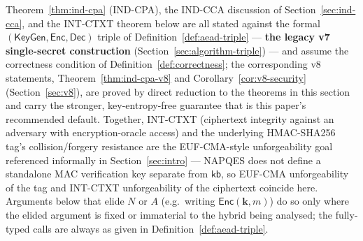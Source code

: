 \documentclass[11pt,a4paper]{article}
\begin{document}
Theorem~\ref{thm:ind-cpa} (IND-CPA), the IND-CCA discussion of
Section~\ref{sec:ind-cca}, and the INT-CTXT theorem below are all stated
against the formal $(\mathsf{KeyGen}, \mathsf{Enc}, \mathsf{Dec})$ triple of
Definition~\ref{def:aead-triple} --- \textbf{the legacy v7 single-secret
construction} (Section~\ref{sec:algorithm-triple}) --- and assume the
correctness condition of Definition~\ref{def:correctness}; the
corresponding v8 statements, Theorem~\ref{thm:ind-cpa-v8} and
Corollary~\ref{cor:v8-security} (Section~\ref{sec:v8}), are proved by
direct reduction to the theorems in this section and carry the stronger,
key-entropy-free guarantee that is this paper's recommended default.
Together, INT-CTXT (ciphertext integrity
against an adversary with encryption-oracle access) and the underlying
HMAC-SHA256 tag's collision/forgery resistance are the EUF-CMA-style
unforgeability goal referenced informally in Section~\ref{sec:intro} —
NAPQES does not define a standalone MAC verification key separate from
$\mathsf{kb}$, so EUF-CMA unforgeability of the tag and INT-CTXT
unforgeability of the ciphertext coincide here. Arguments below that elide
$N$ or $A$ (e.g.\ writing $\mathsf{Enc}(\mathbf{k}, m)$) do so only where the
elided argument is fixed or immaterial to the hybrid being analysed;
the fully-typed calls are always as given in Definition~\ref{def:aead-triple}.
\end{document}
